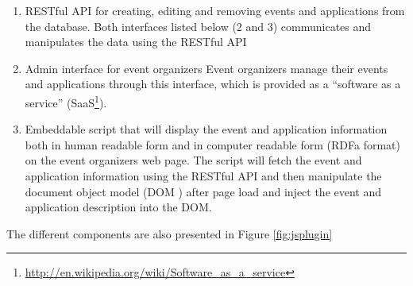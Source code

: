 \begin{enumerate}
\item RESTful  API for creating, editing and removing events and applications from the database.
Both interfaces listed below (2 and 3) communicates and manipulates the data using the RESTful API
\item Admin interface for event organizers
Event organizers manage their events and applications through this interface, which is provided as a ``software as a service'' (SaaS\footnote{\url{http://en.wikipedia.org/wiki/Software_as_a_service}}).
\item Embeddable script that will display the event and application information both in human readable form and in computer readable form (RDFa format) on the event organizers web page.
The script will fetch the event and application information using the RESTful API and then manipulate the document object model (DOM ) after page load and inject the event and application description into the DOM.
\end{enumerate}

The different components are also presented in Figure \ref{fig:jsplugin}

\begin{figure}[!htbp]
\end{figure}

